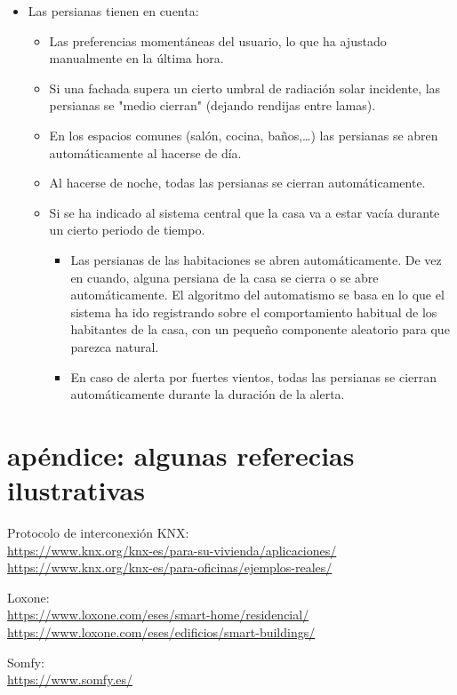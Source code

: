 \documentclass[spanish,10pt,a4paper,final,oneside]{article}
\begin{document}
\begin{itemize}
\item Las persianas tienen en cuenta:
\begin{itemize}
\item Las preferencias momentáneas del usuario, lo que ha ajustado manualmente en la última hora.
\item Si una fachada supera un cierto umbral de radiación solar incidente, las persianas se "medio cierran" (dejando rendijas entre lamas).
\item En los espacios comunes (salón, cocina, baños,\ldots) las persianas se abren automáticamente al hacerse de día.
\item Al hacerse de noche, todas las persianas se cierran automáticamente.
\item Si se ha indicado al sistema central que la casa va a estar vacía durante un cierto periodo de tiempo.
\begin{itemize}
\item Las persianas de las habitaciones se abren automáticamente. De vez en cuando, alguna persiana de la casa se cierra o se abre automáticamente. El algoritmo del automatismo se basa en lo que el sistema ha ido registrando sobre el comportamiento habitual de los habitantes de la casa, con un pequeño componente aleatorio para que parezca natural.
\item En caso de alerta por fuertes vientos, todas las persianas se cierran automáticamente durante la duración de la alerta.
\end{itemize}
\end{itemize}

\end{itemize}




\section{apéndice: algunas referecias ilustrativas}

Protocolo de interconexión KNX:
\\ \url{https://www.knx.org/knx-es/para-su-vivienda/aplicaciones/}
\\ \url{https://www.knx.org/knx-es/para-oficinas/ejemplos-reales/}

Loxone:
\\ \url{https://www.loxone.com/eses/smart-home/residencial/}
\\ \url{https://www.loxone.com/eses/edificios/smart-buildings/}

Somfy:
\\ \url{https://www.somfy.es/}
\end{document}
